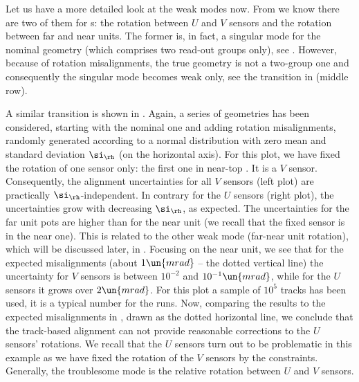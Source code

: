 Let us have a more detailed look at the weak modes now. From  we know there are two of them for  s: the rotation between $U$ and $V$ sensors and the rotation between far and near units. The former is, in fact, a singular mode for the nominal geometry (which comprises two read-out groups only), see . However, because of rotation misalignments, the true geometry is not a two-group one and consequently the singular mode becomes weak only, see the transition in  (middle row).

A similar transition is shown in . Again, a series of geometries has been considered, starting with the nominal one and adding rotation misalignments, randomly generated according to a normal distribution with zero mean and standard deviation $\si_\rh$ (on the horizontal axis). For this plot, we have fixed the rotation of one sensor only: the first one in near-top . It is a $V$ sensor. Consequently, the alignment uncertainties for all $V$ sensors (left plot) are practically $\si_\rh$-independent. In contrary for the $U$ sensors (right plot), the uncertainties grow with decreasing $\si_\rh$, as expected. The uncertainties for the far unit pots are higher than for the near unit (we recall that the fixed sensor is in the near one). This is related to the other weak mode (far-near unit rotation), which will be discussed later, in . Focusing on the near unit, we see that for the expected misalignments (about $1\un{mrad}$ -- the dotted vertical line) the uncertainty for $V$ sensors is between $10^{-2}$ and $10^{-1}\un{mrad}$, while for the $U$ sensors it grows over $2\un{mrad}$. For this plot a sample of $10^5$ tracks has been used, it is a typical number for the  runs. Now, comparing the results to the expected misalignments in , drawn as the dotted horizontal line, we conclude that the track-based alignment can not provide reasonable corrections to the $U$ sensors' rotations. We recall that the $U$ sensors turn out to be problematic in this example as we have fixed the rotation of the $V$ sensors by the constraints. Generally, the troublesome mode is the relative rotation between $U$ and $V$ sensors.

